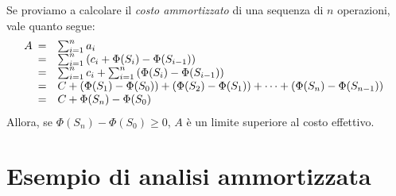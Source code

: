 Se proviamo a calcolare il \emph{costo ammortizzato} di una sequenza di $n$
operazioni, vale quanto segue:
\[A\begin{array}[t]{cl}
    = & \sum_{i=1}^na_i\\
    = & \sum_{i=1}^n\left(c_i+\Phi(S_i)-\Phi(S_{i-1})\right)\\
    = & \sum_{i=1}^nc_i+\sum_{i=1}^n\left(\Phi(S_i)-\Phi(S_{i-1})\right)\\
    = & C + \left(\Phi(S_1) - \Phi(S_{0})\right) + \left(\Phi(S_2) - \Phi(S_1)\right)+\dots+\left(\Phi(S_n)-\Phi(S_{n-1})\right)\\
    = & C + \Phi(S_n) - \Phi(S_0)
\end{array}\]
Allora, se $\Phi(S_n)-\Phi(S_0)\geq0$, $A$ è un limite superiore al costo effettivo.

\section{Esempio di analisi ammortizzata}
